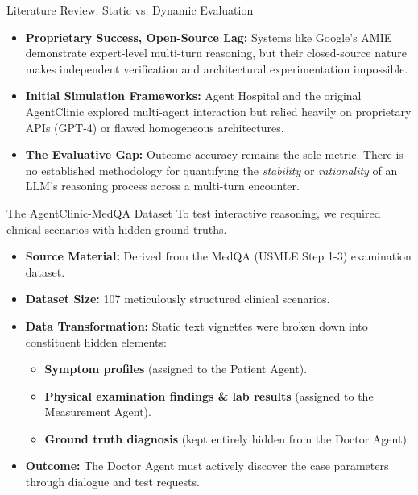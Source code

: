 \documentclass[10pt, aspectratio=169]{beamer}
\begin{document}
\begin{frame}{Literature Review: Static vs. Dynamic Evaluation}
    \begin{itemize}
        \item \textbf{Proprietary Success, Open-Source Lag:} Systems like Google's AMIE demonstrate expert-level multi-turn reasoning, but their closed-source nature makes independent verification and architectural experimentation impossible.
        \item \textbf{Initial Simulation Frameworks:} Agent Hospital and the original AgentClinic explored multi-agent interaction but relied heavily on proprietary APIs (GPT-4) or flawed homogeneous architectures.
        \item \textbf{The Evaluative Gap:} Outcome accuracy remains the sole metric. There is no established methodology for quantifying the \textit{stability} or \textit{rationality} of an LLM's reasoning process across a multi-turn encounter.
    \end{itemize}
\end{frame}

\begin{frame}{The AgentClinic-MedQA Dataset}
    To test interactive reasoning, we required clinical scenarios with hidden ground truths.
    \vspace{0.3cm}
    \begin{itemize}
        \item \textbf{Source Material:} Derived from the MedQA (USMLE Step 1-3) examination dataset.
        \item \textbf{Dataset Size:} 107 meticulously structured clinical scenarios.
        \item \textbf{Data Transformation:} Static text vignettes were broken down into constituent hidden elements:
        \begin{itemize}
            \item \textbf{Symptom profiles} (assigned to the Patient Agent).
            \item \textbf{Physical examination findings \& lab results} (assigned to the Measurement Agent).
            \item \textbf{Ground truth diagnosis} (kept entirely hidden from the Doctor Agent).
        \end{itemize}
        \item \textbf{Outcome:} The Doctor Agent must actively discover the case parameters through dialogue and test requests.
    \end{itemize}
\end{frame}
\end{document}
